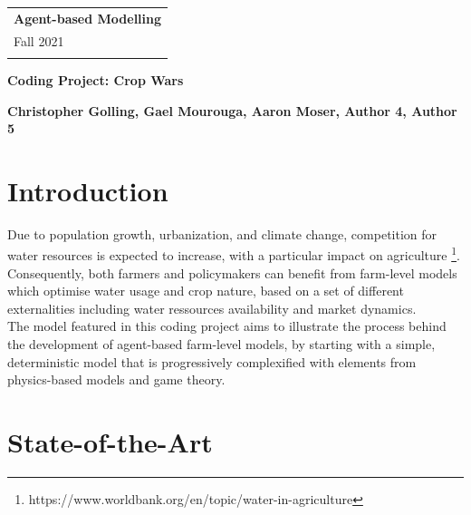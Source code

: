 \documentclass[a4paper,12pt]{article} %
\begin{document}
\thispagestyle{empty} %
\begin{tabular}{p{15.5cm}} %
{\large \bf Agent-based Modelling} \\
Fall 2021  \\
\hline %
\\
\end{tabular} %
\vspace*{0.3cm} %

\begin{center} %
	{\Large \bf Coding Project: Crop Wars}
	\vspace{2mm}
	
	{\bf Christopher Golling, Gael Mourouga, Aaron Moser, Author 4, Author 5 } %
		
\end{center}  

\vspace{0.4cm}

\section{Introduction}

Due to population growth, urbanization, and climate change, competition for water resources is expected to increase, with a particular impact on agriculture \footnote{https://www.worldbank.org/en/topic/water-in-agriculture}. \\
Consequently, both farmers and policymakers can benefit from farm-level models which optimise water usage and crop nature, based on a set of different externalities including water ressources availability and market dynamics.\\
The model featured in this coding project aims to illustrate the process behind the development of agent-based farm-level models, by starting with a simple, deterministic model that is progressively complexified with elements from physics-based models and game theory.


\section{State-of-the-Art}
\end{document}
